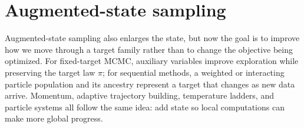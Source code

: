 \section{Augmented-state sampling}
\label{sec:augmented-state-sampling}

Augmented-state sampling also enlarges the state, but now the goal is to improve how we move through a target family rather than to change the objective being optimized.
For fixed-target MCMC, auxiliary variables improve exploration while preserving the target law \(\pi\); for sequential methods, a weighted or interacting particle population and its ancestry represent a target that changes as new data arrive.
Momentum, adaptive trajectory building, temperature ladders, and particle systems all follow the same idea: add state so local computations can make more global progress.






